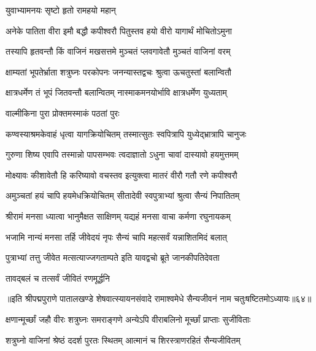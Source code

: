 

\onelineshloka
{युवाभ्यामनयः सृष्टो हृतो रामहयो महान्}%

\twolineshloka
{अनेके पातिता वीरा इमौ बद्धौ कपीश्वरौ}
{पितुस्तव हयो वीरो यागार्थं मोचितोऽमुना}%

\twolineshloka
{तस्यापि हृतवन्तौ किं वाजिनं मखसत्तमे}
{मुञ्चतं प्लवगावेतौ मुञ्चतं वाजिनां वरम्}%

\twolineshloka
{क्षाम्यतां भूपतेर्भ्राता शत्रुघ्नः परकोपनः}
{जनन्यास्तद्वचः श्रुत्वा ऊचतुस्तां बलान्वितौ}%

\twolineshloka
{क्षात्रधर्मेण तं भूपं जितवन्तौ बलान्वितम्}
{नास्माकमनयोर्भावि क्षात्रधर्मेण युध्यताम्}%

\onelineshloka
{वाल्मीकिना पुरा प्रोक्तमस्माकं पठतां पुरः}%

\twolineshloka
{कण्वस्याश्रमकेवाहं धृत्वा यागक्रियोचितम्}
{तस्मात्सुतः स्वपित्रापि युध्येद्भ्रात्रापि चानुजः}%

\twolineshloka
{गुरुणा शिष्य एवापि तस्मान्नो पापसम्भवः}
{त्वदाज्ञातो ऽधुना चावां दास्यावो हयमुत्तमम्}%

\twolineshloka
{मोक्ष्यावः कीशावेतौ हि करिष्यावो वचस्तव}
{इत्युक्त्वा मातरं वीरौ गतौ रणे कपीश्वरौ}%

\twolineshloka
{अमुञ्चतां हयं चापि हयमेधक्रियोचितम्}
{सीतादेवी स्वपुत्राभ्यां श्रुत्वा सैन्यं निपातितम्}%

\twolineshloka
{श्रीरामं मनसा ध्यात्वा भानुमैक्षत साक्षिणम्}
{यद्यहं मनसा वाचा कर्मणा रघुनायकम्}%

\twolineshloka
{भजामि नान्यं मनसा तर्हि जीवेदयं नृपः}
{सैन्यं चापि महत्सर्वं यन्नाशितमिदं बलात्}%

\twolineshloka
{पुत्राभ्यां तत्तु जीवेत मत्सत्याज्जगताम्पते}
{इति यावद्वचो ब्रूते जानकीपतिदेवता}%

\onelineshloka
{तावद्बलं च तत्सर्वं जीवितं रणमूर्द्धनि}%

॥इति श्रीपद्मपुराणे पातालखण्डे शेषवात्स्यायनसंवादे रामाश्वमेधे सैन्यजीवनं नाम चतुःषष्टितमोऽध्यायः॥६४॥



\twolineshloka
{क्षणान्मूर्च्छां जहौ वीरः शत्रुघ्नः समराङ्गणे}
{अन्येऽपि वीराबलिनो मूर्च्छां प्राप्ताः सुजीविताः}%

\twolineshloka
{शत्रुघ्नो वाजिनां श्रेष्ठं ददर्श पुरतः स्थितम्}
{आत्मानं च शिरस्त्राणरहितं सैन्यजीवितम्}%

